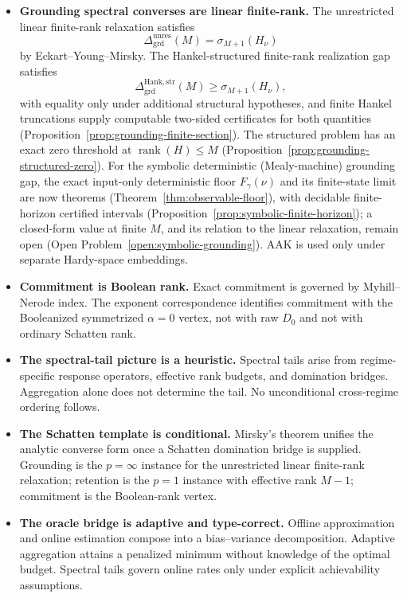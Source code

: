 \documentclass[12pt]{article}
\theoremstyle{definition}
\DeclareMathOperator{\rank}{rank}
\newcommand{\Dunres}{\Delta_{\mathrm{grd}}^{\mathrm{unres}}}
\newcommand{\DHankstr}{\Delta_{\mathrm{grd}}^{\mathrm{Hank,str}}}
\begin{document}
\begin{itemize}[leftmargin=1.8em]
\item \textbf{Grounding spectral converses are linear finite-rank.}
The unrestricted linear finite-rank relaxation satisfies
\[
\Dunres(M)
=
\sigma_{M+1}(H_\nu)
\]
by Eckart--Young--Mirsky.  The Hankel-structured finite-rank realization gap
satisfies
\[
\DHankstr(M)
\ge
\sigma_{M+1}(H_\nu),
\]
with equality only under additional structural hypotheses, and finite
Hankel truncations supply computable two-sided certificates for both
quantities (Proposition~\ref{prop:grounding-finite-section}).  The structured
problem has an exact zero threshold at $\rank(H)\le M$
(Proposition~\ref{prop:grounding-structured-zero}).  For the symbolic
deterministic (Mealy-machine) grounding gap, the exact input-only
deterministic floor $F_\gamma(\nu)$ and its finite-state limit are now
theorems (Theorem~\ref{thm:observable-floor}), with decidable finite-horizon
certified intervals (Proposition~\ref{prop:symbolic-finite-horizon}); a
closed-form value at finite $M$, and its relation to the linear relaxation,
remain open (Open Problem~\ref{open:symbolic-grounding}).  AAK is used only
under separate Hardy-space embeddings.

\item \textbf{Commitment is Boolean rank.}
Exact commitment is governed by Myhill--Nerode index.  The exponent
correspondence identifies commitment with the Booleanized symmetrized
$\alpha=0$ vertex, not with raw $D_0$ and not with ordinary Schatten rank.

\item \textbf{The spectral-tail picture is a heuristic.}
Spectral tails arise from regime-specific response operators, effective rank
budgets, and domination bridges.  Aggregation alone does not determine the
tail.  No unconditional cross-regime ordering follows.

\item \textbf{The Schatten template is conditional.}
Mirsky's theorem unifies the analytic converse form once a Schatten
domination bridge is supplied.  Grounding is the $p=\infty$ instance for the
unrestricted linear finite-rank relaxation; retention is the $p=1$ instance
with effective rank $M-1$; commitment is the Boolean-rank vertex.

\item \textbf{The oracle bridge is adaptive and type-correct.}
Offline approximation and online estimation compose into a bias--variance
decomposition.  Adaptive aggregation attains a penalized minimum without
knowledge of the optimal budget.  Spectral tails govern online rates only
under explicit achievability assumptions.


\end{itemize}
\end{document}
